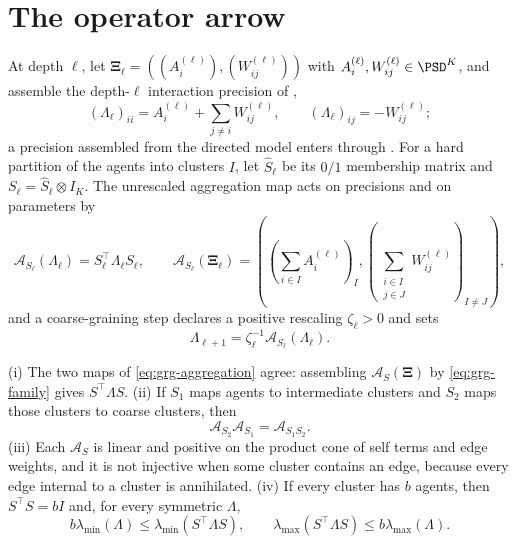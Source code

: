 \section{The operator arrow}
\label{sec:grg-operator-arrow}

At depth \(\ell\), let \(\boldsymbol\Xi_\ell=((A_i^{(\ell)}),(W_{ij}^{(\ell)}))\) with
\(A_i^{(\ell)},W_{ij}^{(\ell)}\in\PSD^K\), and assemble the depth-\(\ell\) interaction
precision of ,
\begin{equation}
(\Lambda_\ell)_{ii}
=A_i^{(\ell)}+\sum_{j\ne i}W_{ij}^{(\ell)},
\qquad
(\Lambda_\ell)_{ij}=-W_{ij}^{(\ell)};
\label{eq:grg-family}
\end{equation}
a precision assembled from the directed model enters through
. For a hard partition of the agents into clusters
\(I\), let \(\widehat S_\ell\) be its \(0/1\) membership matrix and
\(S_\ell=\widehat S_\ell\otimes I_K\). The unrescaled aggregation map acts on precisions
and on parameters by
\begin{equation}
\mathcal A_{S_\ell}(\Lambda_\ell)
=S_\ell^\top\Lambda_\ell S_\ell,
\qquad
\mathcal A_{S_\ell}(\boldsymbol\Xi_\ell)
=\left(
\left(\sum_{i\in I}A_i^{(\ell)}\right)_I,
\left(\sum_{\substack{i\in I\\j\in J}}W_{ij}^{(\ell)}\right)_{I\ne J}
\right),
\label{eq:grg-aggregation}
\end{equation}
and a coarse-graining step declares a positive rescaling \(\zeta_\ell>0\) and sets
\begin{equation}
\Lambda_{\ell+1}
=\zeta_\ell^{-1}\mathcal A_{S_\ell}(\Lambda_\ell).
\label{eq:grg-flow}
\end{equation}

(i) The two maps of \eqref{eq:grg-aggregation} agree: assembling
\(\mathcal A_S(\boldsymbol\Xi)\) by \eqref{eq:grg-family} gives \(S^\top\Lambda S\).
(ii) If \(S_1\) maps agents to intermediate clusters and \(S_2\) maps those clusters to
coarse clusters, then
\begin{equation}
\mathcal A_{S_2}\mathcal A_{S_1}
=\mathcal A_{S_1S_2}.
\label{eq:grg-semigroup}
\end{equation}
(iii) Each \(\mathcal A_S\) is linear and positive on the product cone of self terms and
edge weights, and it is not injective when some cluster contains an edge, because
every edge internal to a cluster is annihilated.
(iv) If every cluster has \(b\) agents, then \(S^\top S=bI\) and, for every symmetric
\(\Lambda\),
\begin{equation}
b\lambda_{\min}(\Lambda)
\leq\lambda_{\min}(S^\top\Lambda S),
\qquad
\lambda_{\max}(S^\top\Lambda S)
\leq b\lambda_{\max}(\Lambda).
\label{eq:grg-spectral-bounds}
\end{equation}

